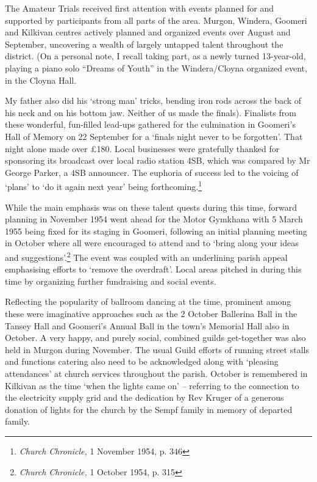 The Amateur Trials received first attention with events planned for and supported by participants from all parts of the area. Murgon, Windera, Goomeri and Kilkivan centres actively planned and organized events over August and September, uncovering a wealth of largely untapped talent throughout the district. (On a personal note, I recall taking part, as a newly turned 13-year-old, playing a piano solo ``Dreams of Youth'' in the Windera/Cloyna organized event, in the Cloyna Hall.



My father also did his `strong man' tricks, bending iron rods across the back of his neck and on his bottom jaw. Neither of us made the finals). Finalists from these wonderful, fun-filled lead-ups gathered for the culmination in Goomeri's Hall of Memory on 22 September for a `finals night never to be forgotten'. That night alone made over \pounds180. Local businesses were gratefully thanked for sponsoring its broadcast over local radio station 4SB, which was compared by Mr George Parker, a 4SB announcer. The euphoria of success led to the voicing of `plans' to `do it again next year' being forthcoming.\footnote{\emph{Church Chronicle,} 1 November 1954, p. 346}


While the main emphasis was on these talent quests during this time, forward planning in November 1954 went ahead for the Motor Gymkhana with 5 March 1955 being fixed for its staging in Goomeri, following an initial planning meeting in October where all were encouraged to attend and to `bring along your ideas and suggestions'.\footnote{\emph{Church Chronicle,} 1 October 1954, p. 315} The event was coupled with an underlining parish appeal emphasising efforts to `remove the overdraft'. Local areas pitched in during this time by organizing further fundraising and social events.


Reflecting the popularity of ballroom dancing at the time, prominent among these were imaginative approaches such as the 2 October Ballerina Ball in the Tansey Hall and Goomeri's Annual Ball in the town's Memorial Hall also in October. A very happy, and purely social, combined guilds get-together was also held in Murgon during November. The usual Guild efforts of running street stalls and functions catering also need to be acknowledged along with `pleasing attendances' at church services throughout the parish. October is remembered in Kilkivan as the time `when the lights came on' -- referring to the connection to the electricity supply grid and the dedication by Rev Kruger of a generous donation of lights for the church by the Sempf family in memory of departed family.









